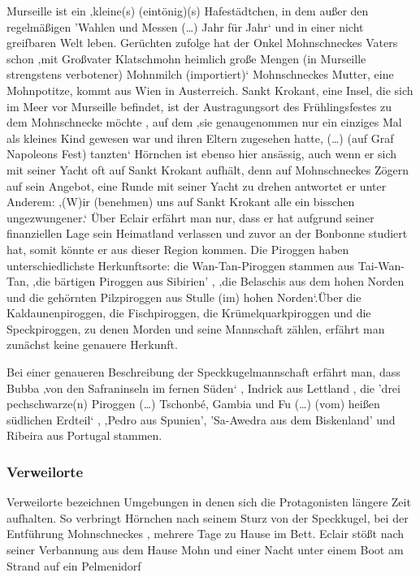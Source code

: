 Murseille ist ein ‚kleine(s) (eintönig)(s) Hafestädtchen, in dem außer den regelmäßigen 'Wahlen und Messen (…) Jahr für Jahr‘ \cite[S. 10[{pir} nichts außergewöhnliches passiert. Die Bewohner leben sicher ‚in häuslicher Geborgenheit‘ und erzählen sich höchstens Gruselgeschichten von ‚wilden Piroggenpiraten, (die als) etwas Fernes und Sagenhaftes (gelten)‘ \cite[S.10]{pir} und in einer nicht greifbaren Welt leben. Gerüchten zufolge hat der Onkel Mohnschneckes Vaters schon ‚mit Großvater Klatschmohn heimlich große Mengen (in Murseille strengstens verbotener) Mohnmilch (importiert)‘\cite[S.14]{pir} Mohnschneckes Mutter, eine Mohnpotitze, kommt aus Wien in Austerreich. \cite[S. 13]{pir} Sankt Krokant, eine Insel, die sich im Meer vor Murseille befindet, ist der Austragungsort des Frühlingsfestes zu dem Mohnschnecke möchte \cite[S.17]{pir}, auf dem ‚sie genaugenommen nur ein einziges Mal als kleines Kind gewesen war und ihren Eltern zugesehen hatte, (…) (auf Graf Napoleons Fest) tanzten‘ \cite[S.521]{pir} 
Hörnchen ist ebenso hier ansässig, auch wenn er sich mit seiner Yacht oft auf Sankt Krokant aufhält, denn auf Mohnschneckes Zögern auf sein Angebot, eine Runde mit seiner Yacht zu drehen antwortet er unter Anderem: ‚(W)ir (benehmen) uns auf Sankt Krokant alle ein bisschen ungezwungener.‘\cite[S.25]{pir} 
Über Eclair erfährt man nur, dass er hat aufgrund seiner finanziellen Lage sein Heimatland verlassen und zuvor an der Bonbonne studiert hat, somit könnte er aus dieser Region kommen. \cite[S.15f]{pir}
Die Piroggen haben unterschiedlichste Herkunftsorte: die Wan-Tan-Piroggen stammen aus Tai-Wan-Tan, \cite[S.8]{pir}
 ‚die bärtigen Piroggen aus Sibirien' \cite[S.8]{pir}, ‚die Belaschis aus dem hohen Norden \cite[S.9]{pir} und die gehörnten Pilzpiroggen aus Stulle (im) hohen Norden‘\cite[S.9]{pir}.Über die Kaldaunenpiroggen, die Fischpiroggen, die Krümelquarkpiroggen und die Speckpiroggen, zu denen Morden und seine Mannschaft zählen, erfährt man zunächst keine genauere Herkunft. \cite[S.9f]{pir}

Bei einer genaueren Beschreibung der Speckkugelmannschaft erfährt man, dass Bubba ‚von den Safraninseln im fernen Süden‘ \cite[S.46]{pir}, Indrick aus Lettland \cite[S.46f]{pir}, die 'drei pechschwarze(n) Piroggen (…) Tschonbé, Gambia und Fu (…) (vom) heißen südlichen Erdteil‘ \cite[S.47]{pir}, ‚Pedro aus Spunien'\cite[S.47]{pir}, 'Sa-Awedra aus dem Biskenland' \cite[S.47]{pir} und Ribeira aus Portugal \cite[S.47]{pir} stammen.


\subsubsection{Verweilorte}
Verweilorte bezeichnen Umgebungen in denen sich die Protagonisten längere Zeit aufhalten.
So verbringt Hörnchen nach seinem Sturz von der Speckkugel, bei der Entführung Mohnschneckes \cite[S.34]{pir}, mehrere Tage zu Hause im Bett. \cite[7. Kapitel]{pir}\cite[S.82]{pir} Eclair stößt nach seiner Verbannung aus dem Hause Mohn \cite[S.41]{pir} und einer Nacht unter einem Boot am Strand \cite[S.43]{pir} auf ein Pelmenidorf \cite[S.43]{pir}


